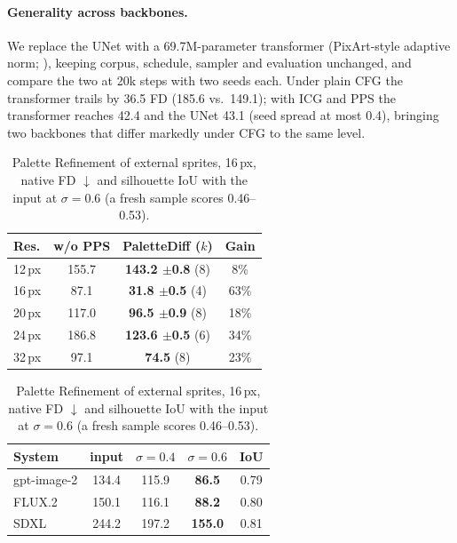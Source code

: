 \documentclass{article} %
\newcommand{\pmsd}[1]{{\scriptsize$\pm$#1}}
\newcommand{\ours}{PaletteDiff}
\begin{document}
\paragraph{Generality across backbones.}
We replace the UNet with a 69.7M-parameter transformer (PixArt-style adaptive norm; \citealt{Chen2023pixart}), keeping corpus, schedule, sampler
and evaluation unchanged, and compare the two at 20k steps with two seeds each. Under plain CFG the transformer trails
by 36.5 FD (185.6 vs.\ 149.1); with ICG and PPS the transformer reaches 42.4 and the UNet 43.1 (seed spread at most
0.4), bringing two backbones that differ markedly under CFG to the same level.

\begin{table}[t]
\centering
\begin{minipage}[t]{0.49\linewidth}
\centering
\caption{Other resolutions, native FD $\downarrow$ (ICG $w{=}2$). Ours: three seeds at 12--24\,px.}
\label{tab:res}
\small
\begin{tabular}{@{}lccc@{}}
\toprule
Res. & w/o PPS & \ours{} ($k$) & Gain \\
\midrule
12\,px & 155.7 & \textbf{143.2 \pmsd{0.8}} (8) & 8\% \\
16\,px & 87.1  & \textbf{31.8 \pmsd{0.5}} (4) & 63\% \\
20\,px & 117.0 & \textbf{96.5 \pmsd{0.9}} (8) & 18\% \\
24\,px & 186.8 & \textbf{123.6 \pmsd{0.5}} (6) & 34\% \\
32\,px & 97.1  & \textbf{74.5} (8) & 23\% \\
\bottomrule
\end{tabular}
\end{minipage}\hfill
\begin{minipage}[t]{0.49\linewidth}
\centering
\caption{Palette Refinement of external sprites, 16\,px, native FD $\downarrow$ and silhouette IoU with the input at
$\sigma{=}0.6$ (a fresh sample scores 0.46--0.53).}
\label{tab:refine}
\small
\begin{tabular}{@{}lcccc@{}}
\toprule
System & input & $\sigma{=}0.4$ & $\sigma{=}0.6$ & IoU \\
\midrule
gpt-image-2  & 134.4 & 115.9 & \textbf{86.5}  & 0.79 \\
FLUX.2       & 150.1 & 116.1 & \textbf{88.2}  & 0.80 \\
SDXL         & 244.2 & 197.2 & \textbf{155.0} & 0.81 \\
\bottomrule
\end{tabular}
\end{minipage}
\end{table}
\end{document}
